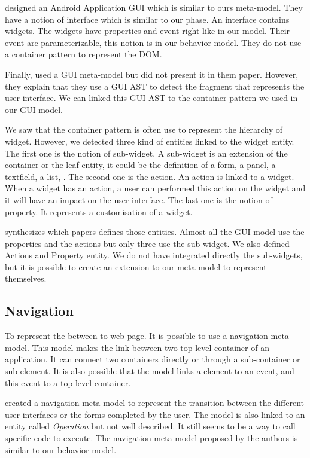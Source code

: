\documentclass[conference]{IEEEtran}
\begin{document}
\citet{amalfitano2012using} designed an Android Application GUI which is similar to ours meta-model.
They have a notion of interface which is similar to our phase.
An interface contains widgets.
The widgets have properties and event right like in our model.
Their event are parameterizable, this notion is in our behavior model.
They do not use a container pattern to represent the DOM.

Finally, \citet{silva2010guisurfer} used a GUI meta-model but did not present it
    in them paper.
However, they explain that they use a GUI AST to detect the fragment that represents the user interface.
We can linked this GUI AST to the container pattern we used in our GUI model.


We saw that the container pattern is often use to represent the hierarchy of widget.
However, we detected three kind of entities linked to the widget entity. 
The first one is the notion of sub-widget.
A sub-widget is an extension of the container or the leaf entity,
    it could be the definition of a form, a panel, a textfield, a list, \etc.
The second one is the action.
An action is linked to a widget.
When a widget has an action, a user can performed this action on the widget and it will
    have an impact on the user interface.
The last one is the notion of property.
It represents a customisation of a widget.

 synthesizes which papers defines those entities.
Almost all the GUI model use the properties and the actions but
    only three use the sub-widget.
We also defined Actions and Property entity.
We do not have integrated directly the sub-widgets, but it is possible to create an extension to our meta-model
    to represent themselves.

\subsection{Navigation}
\label{sec:navigation}

To represent the between to web page.
It is possible to use a navigation meta-model.
This model makes the link between two top-level container of
    an application.
It can connect two containers directly or through a sub-container or sub-element.
It is also possible that the model links a element to an event,
    and this event to a top-level container.

\citet{fleurey2007model} created a navigation meta-model to represent the
    transition between the different user interfaces or the forms completed by the user.
The model is also linked to an entity called \textit{Operation} but not well described.
It still seems to be a way to call specific code to execute.
The navigation meta-model proposed by the authors is similar to our behavior model.
\end{document}
